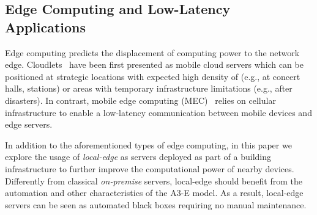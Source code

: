 

\subsection{Edge Computing and Low-Latency Applications}

Edge computing predicts the displacement of computing power to the network edge. Cloudlets~\cite{CLOUDLETS} have been first presented as mobile cloud servers which can be positioned at strategic locations with expected high density of (e.g., at concert halls, stations) or areas with temporary infrastructure limitations (e.g., after disasters). In contrast, mobile edge computing (MEC)~\cite{MEC} relies on cellular infrastructure to enable a low-latency communication between mobile devices and edge servers. 

In addition to the aforementioned types of edge computing, in this paper we explore the usage of \textit{local-edge} as servers deployed as part of a building infrastructure to further improve the computational power of nearby devices. Differently from classical \textit{on-premise} servers, local-edge should benefit from the automation and other characteristics of the A3-E model. As a result, local-edge servers can be seen as automated black boxes requiring no manual maintenance.
